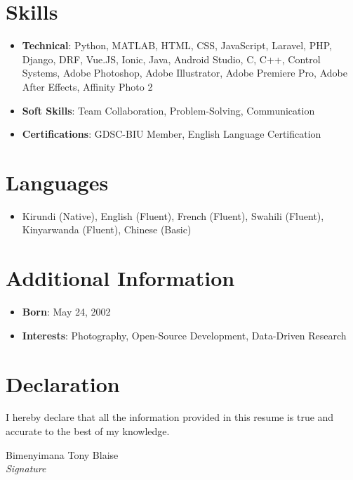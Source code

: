 \documentclass[10pt,letterpaper]{article}
\begin{document}
\section*{Skills}
\begin{itemize}[leftmargin=*,nosep]
    \item \textbf{Technical}: Python, MATLAB, HTML, CSS, JavaScript, Laravel, PHP, Django, DRF, Vue.JS, Ionic, Java, Android Studio, C, C++, Control Systems, Adobe Photoshop, Adobe Illustrator, Adobe Premiere Pro, Adobe After Effects, Affinity Photo 2
    \item \textbf{Soft Skills}: Team Collaboration, Problem-Solving, Communication
    \item \textbf{Certifications}: GDSC-BIU Member, English Language Certification
\end{itemize}

\section*{Languages}
\begin{itemize}[leftmargin=*,nosep]
    \item Kirundi (Native), English (Fluent), French (Fluent), Swahili (Fluent), Kinyarwanda (Fluent), Chinese (Basic)
\end{itemize}

\section*{Additional Information}
\begin{itemize}[leftmargin=*,nosep]
    \item \textbf{Born}: May 24, 2002
    \item \textbf{Interests}: Photography, Open-Source Development, Data-Driven Research
\end{itemize}

\section*{Declaration}
I hereby declare that all the information provided in this resume is true and accurate to the best of my knowledge.

\vspace{0.5cm}
{\calligra \large Bimenyimana Tony Blaise} \\
\textit{Signature}
\end{document}
